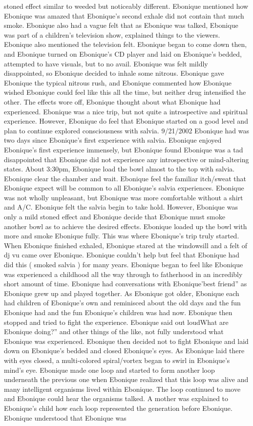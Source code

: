 \documentclass[12pt]{book}
\begin{document}
stoned effect similar to weeded but noticeably different. Ebonique mentioned how Ebonique was amazed that Ebonique's second exhale did not contain that much smoke. Ebonique also had a vague felt that as Ebonique was talked, Ebonique was part of a children's television show, explained things to the viewers. Ebonique also mentioned the television felt. Ebonique began to come down then, and Ebonique turned on Ebonique's CD player and laid on Ebonique's bedded, attempted to have visuals, but to no avail. Ebonique was felt mildly disappointed, so Ebonique decided to inhale some nitrous. Ebonique gave Ebonique the typical nitrous rush, and Ebonique commented how Ebonique wished Ebonique could feel like this all the time, but neither drug intensified the other. The effects wore off, Ebonique thought about what Ebonique had experienced. Ebonique was a nice trip, but not quite a introspective and spiritual experience. However, Ebonique do feel that Ebonique started on a good level and plan to continue explored consciousness with salvia. 9/21/2002 Ebonique had was two days since Ebonique's first experience with salvia. Ebonique enjoyed Ebonique's first experience immensely, but Ebonique found Ebonique was a tad disappointed that Ebonique did not experience any introspective or mind-altering states. About 3:30pm, Ebonique load the bowl almost to the top with salvia. Ebonique clear the chamber and wait. Ebonique feel the familiar itch/sweat that Ebonique expect will be common to all Ebonique's salvia experiences. Ebonique was not wholly unpleasant, but Ebonique was more comfortable without a shirt and A/C. Ebonique felt the salvia begin to take hold. However, Ebonique was only a mild stoned effect and Ebonique decide that Ebonique must smoke another bowl as to achieve the desired effects. Ebonique loaded up the bowl with more and smoke Ebonique fully. This was where Ebonique's trip truly started. When Ebonique finished exhaled, Ebonique stared at the windowsill and a felt of dj vu came over Ebonique. Ebonique couldn't help but feel that Ebonique had did this ( smoked salvia ) for many years. Ebonique began to feel like Ebonique was experienced a childhood all the way through to fatherhood in an incredibly short amount of time. Ebonique had conversations with Ebonique'best friend'' as Ebonique grew up and played together. As Ebonique got older, Ebonique each had children of Ebonique's own and reminisced about the old days and the fun Ebonique had and the fun Ebonique's children was had now. Ebonique then stopped and tried to fight the experience. Ebonique said out loudWhat are Ebonique doing?'' and other things of the like, not fully understood what Ebonique was experienced. Ebonique then decided not to fight Ebonique and laid down on Ebonique's bedded and closed Ebonique's eyes. As Ebonique laid there with eyes closed, a multi-colored spiral/vortex began to swirl in Ebonique's mind's eye. Ebonique made one loop and started to form another loop underneath the previous one when Ebonique realized that this loop was alive and many intelligent organisms lived within Ebonique. The loop continued to move and Ebonique could hear the organisms talked. A mother was explained to Ebonique's child how each loop represented the generation before Ebonique. Ebonique understood that Ebonique was 
\end{document}
